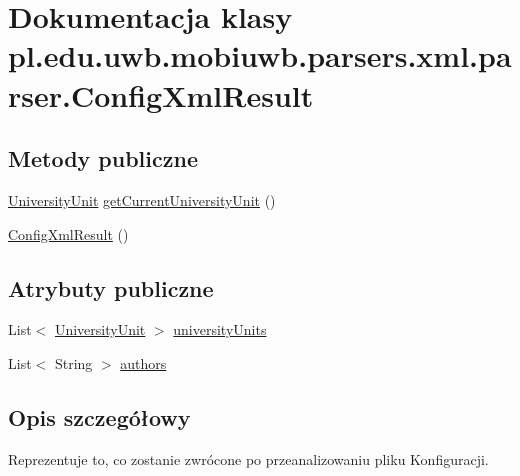 \hypertarget{classpl_1_1edu_1_1uwb_1_1mobiuwb_1_1parsers_1_1xml_1_1parser_1_1_config_xml_result}{}\section{Dokumentacja klasy pl.\+edu.\+uwb.\+mobiuwb.\+parsers.\+xml.\+parser.\+Config\+Xml\+Result}
\label{classpl_1_1edu_1_1uwb_1_1mobiuwb_1_1parsers_1_1xml_1_1parser_1_1_config_xml_result}
\subsection*{Metody publiczne}
\begin{DoxyCompactItemize}
\item 
\hyperlink{classpl_1_1edu_1_1uwb_1_1mobiuwb_1_1parsers_1_1xml_1_1parser_1_1_university_unit}{University\+Unit} \hyperlink{classpl_1_1edu_1_1uwb_1_1mobiuwb_1_1parsers_1_1xml_1_1parser_1_1_config_xml_result_a15799413ba45888ba1e791c47004f2b0}{get\+Current\+University\+Unit} ()
\item 
\hyperlink{classpl_1_1edu_1_1uwb_1_1mobiuwb_1_1parsers_1_1xml_1_1parser_1_1_config_xml_result_a528767a5847aa09a2a66b857e9878830}{Config\+Xml\+Result} ()
\end{DoxyCompactItemize}
\subsection*{Atrybuty publiczne}
\begin{DoxyCompactItemize}
\item 
List$<$ \hyperlink{classpl_1_1edu_1_1uwb_1_1mobiuwb_1_1parsers_1_1xml_1_1parser_1_1_university_unit}{University\+Unit} $>$ \hyperlink{classpl_1_1edu_1_1uwb_1_1mobiuwb_1_1parsers_1_1xml_1_1parser_1_1_config_xml_result_aa961210a445db8973482d65dd8bf9967}{university\+Units}
\item 
List$<$ String $>$ \hyperlink{classpl_1_1edu_1_1uwb_1_1mobiuwb_1_1parsers_1_1xml_1_1parser_1_1_config_xml_result_ae06cc4d398e7acbdf759e259fca6d8f2}{authors}
\end{DoxyCompactItemize}


\subsection{Opis szczegółowy}
Reprezentuje to, co zostanie zwrócone po przeanalizowaniu pliku Konfiguracji. 

